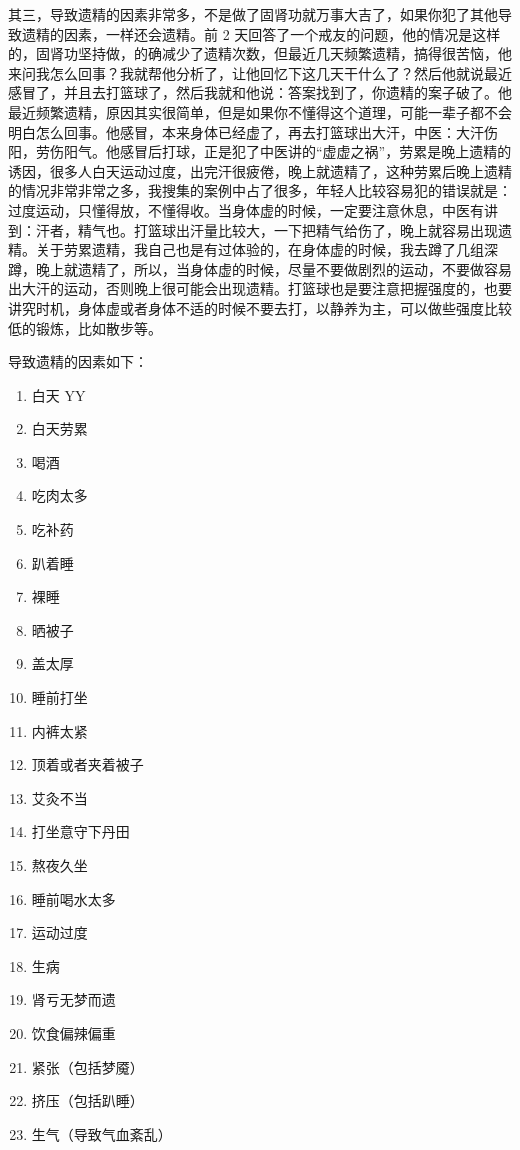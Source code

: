 \documentclass[fontset=founder]{ctexart}
\begin{document}
其三，导致遗精的因素非常多，不是做了固肾功就万事大吉了，如果你犯了其他导致遗精的因素，一样还会遗精。前 2 天回答了一个戒友的问题，他的情况是这样的，固肾功坚持做，的确减少了遗精次数，但最近几天频繁遗精，搞得很苦恼，他来问我怎么回事？我就帮他分析了，让他回忆下这几天干什么了？然后他就说最近感冒了，并且去打篮球了，然后我就和他说：答案找到了，你遗精的案子破了。他最近频繁遗精，原因其实很简单，但是如果你不懂得这个道理，可能一辈子都不会明白怎么回事。他感冒，本来身体已经虚了，再去打篮球出大汗，中医：大汗伤阳，劳伤阳气。他感冒后打球，正是犯了中医讲的“虚虚之祸”，劳累是晚上遗精的诱因，很多人白天运动过度，出完汗很疲倦，晚上就遗精了，这种劳累后晚上遗精的情况非常非常之多，我搜集的案例中占了很多，年轻人比较容易犯的错误就是：过度运动，只懂得放，不懂得收。当身体虚的时候，一定要注意休息，中医有讲到：汗者，精气也。打篮球出汗量比较大，一下把精气给伤了，晚上就容易出现遗精。关于劳累遗精，我自己也是有过体验的，在身体虚的时候，我去蹲了几组深蹲，晚上就遗精了，所以，当身体虚的时候，尽量不要做剧烈的运动，不要做容易出大汗的运动，否则晚上很可能会出现遗精。打篮球也是要注意把握强度的，也要讲究时机，身体虚或者身体不适的时候不要去打，以静养为主，可以做些强度比较低的锻炼，比如散步等。

导致遗精的因素如下：

\begin{enumerate}
    \item 白天 YY
    \item 白天劳累
    \item 喝酒
    \item 吃肉太多
    \item 吃补药
    \item 趴着睡
    \item 裸睡
    \item 晒被子
    \item 盖太厚
    \item 睡前打坐
    \item 内裤太紧
    \item 顶着或者夹着被子
    \item 艾灸不当
    \item 打坐意守下丹田
    \item 熬夜久坐
    \item 睡前喝水太多
    \item 运动过度
    \item 生病
    \item 肾亏无梦而遗
    \item 饮食偏辣偏重
    \item 紧张（包括梦魇）
    \item 挤压（包括趴睡）
    \item 生气（导致气血紊乱）
\end{enumerate}
\end{document}
